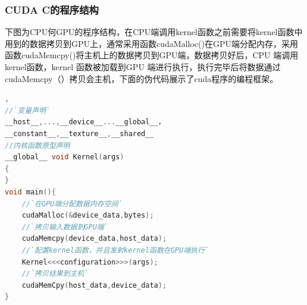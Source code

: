 \subsubsection{CUDA C的程序结构}
下图为CPU何GPU的程序结构，在CPU端调用kernel函数之前需要将kernel函数中用到的数据拷贝到GPU上，通常采用函数cudaMalloc()在GPU端分配内存，采用函数cudaMemcpy()将主机上的数据拷贝到GPU端，数据拷贝好后，CPU 端调用kernel函数，kernel 函数被加载到GPU 端进行执行，执行完毕后将数据通过cudaMemcpy（）拷贝会主机，下面的伪代码展示了cuda程序的编程框架。\newline
\begin{lstlisting}[language=C],
//`变量声明`
__host__,...,__device__...__global__，
__constant__,__texture__,__shared__
//内核函数原型声明
__global__ void Kernel(args)
{
}
void main(){
    //`在GPU端分配数据内存空间`
    cudaMalloc(&device_data,bytes);
    //`拷贝输入数据到GPU端`
    cudaMemcpy(device_data,host_data);
    //`配置kernel函数，并且发射kernel函数在GPU端执行`
    Kernel<<<configuration>>>(args);
    //`拷贝结果到主机`
    cudaMemCpy(host_data,device_data);
}
\end{lstlisting}
